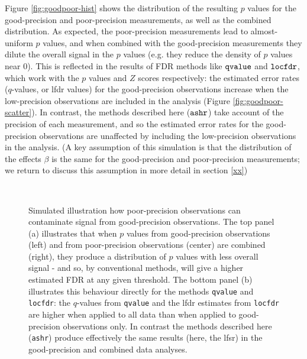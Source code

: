 \documentclass[11pt]{article}
\def\qvalue{{\tt qvalue}\xspace}
\def\locfdr{{\tt locfdr}\xspace}
\def\ashr{{\tt ashr}\xspace}
\begin{document}
Figure \ref{fig:goodpoor-hist} shows the distribution of the resulting $p$ values for the good-precision and poor-precision measurements, as
well as the combined distribution. As expected, the poor-precision measurements lead to almost-uniform $p$ values, and when combined
with the good-precision measurements they dilute the overall signal in the $p$ values (e.g. they reduce the density of $p$ values near 0).
This is reflected in the results of FDR methods like $\qvalue$ and $\locfdr$, which work with the $p$ values and $Z$ scores respectively:
the estimated error rates ($q$-values, or lfdr values) for the good-precision observations increase when the low-precision observations are included in the analysis
(Figure \ref{fig:goodpoor-scatter}). In contrast, the methods described here ($\ashr$) take account of the precision of each measurement, and so
the estimated error rates for the good-precision observations are unaffected by including the low-precision observations in the analysis.
(A key assumption of this simulation is that the distribution of the effects $\beta$ is the same for the good-precision and poor-precision measurements;
we return to discuss this assumption in more detail in section \ref{xx})


\begin{figure}
\centering
{} \\
\caption{Simulated illustration how poor-precision observations can contaminate signal from good-precision observations. The top panel (a) illustrates that when 
$p$ values from good-precision observations (left) and from poor-precision observations (center) are combined (right), they produce
a distribution of $p$ values with less overall signal - and so, by conventional methods, will give a higher estimated FDR at any given threshold.
The bottom panel (b) illustrates this behaviour directly for the methods \qvalue and \locfdr: the $q$-values from \qvalue and the lfdr estimates from \locfdr are higher when applied to all data than when applied to good-precision observations only. In contrast the methods described here (\ashr) produce effectively the same results (here, the lfsr) in the good-precision and combined data analyses.} \label{fig:goodpoor}
\end{figure}
\end{document}
